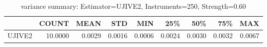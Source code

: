 \begin{table}[ht]
\centering
\caption{variance summary: Estimator=UJIVE2, Instruments=250, Strength=0.60}
\begin{tabular}{lrrrrrrrr}
\toprule
 & COUNT & MEAN & STD & MIN & 25\% & 50\% & 75\% & MAX \\
\midrule
UJIVE2 & 10.0000 & 0.0029 & 0.0016 & 0.0006 & 0.0024 & 0.0030 & 0.0032 & 0.0067 \\
\bottomrule
\end{tabular}
\end{table}
